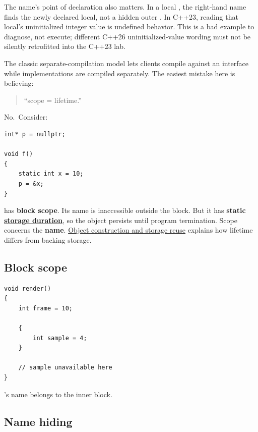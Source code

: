 The name's point of declaration also matters. In a local , the right-hand name finds the newly declared local, not a hidden outer . In C++23, reading that local's uninitialized integer value is undefined behavior. This is a bad example to diagnose, not execute; different C++26 uninitialized-value wording must not be silently retrofitted into the C++23 lab.

The classic separate-compilation model lets clients compile against an interface while implementations are compiled separately. The easiest mistake here is believing:

\begin{quote}
``scope = lifetime.''
\end{quote}

No.~Consider:

\begin{verbatim}
int* p = nullptr;

void f()
{
    static int x = 10;
    p = &x;
}
\end{verbatim}

 has \textbf{block scope}. Its name  is inaccessible outside the block. But it has \textbf{static \hyperref[appendix-0b104bcba06b]{storage duration}}, so the object persists until program termination. Scope concerns the \textbf{name}. \hyperref[appendix-a82f9c438857]{Object construction and storage reuse} explains how lifetime differs from backing storage.

\subsection{Block scope}\label{01-foundations-i-ch002-block-scope}

\hypertarget{01-foundations-i-ch002-block-scope}{}

\begin{verbatim}
void render()
{
    int frame = 10;

    {
        int sample = 4;
    }

    // sample unavailable here
}
\end{verbatim}

's name belongs to the inner block.

\subsection{Name hiding}\label{01-foundations-i-ch002-name-hiding}


